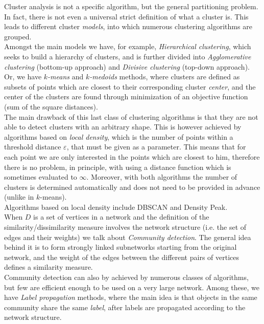 \documentclass[a4paper,11pt]{book}
\begin{document}
Cluster analysis is not a specific algorithm, but the general partitioning problem. In fact, there is not even a universal strict definition of what a cluster is. This leads to different cluster \textit{models}, into which numerous clustering algorithms are grouped.\\
Amongst the main models we have, for example, \textit{Hierarchical clustering}\cite{hie}, which seeks to build a hierarchy of clusters, and is further divided into \textit{Agglomerative clustering} (bottom-up approach) and \textit{Divisive clustering} (top-down approach).\\
Or, we have $k$\textit{-means} and $k$\textit{-medoids} methods, where clusters are defined as subsets of points which are closest to their corresponding cluster \textit{center}, and the center of the clusters are found through minimization of an objective function (sum of the square distances).\\
The main drawback of this last class of clustering algorithms is that they are not able to detect clusters with an arbitrary shape. This is however achieved by algorithms based on \textit{local density}, which is the number of points within a threshold distance $\varepsilon$, that must be given as a parameter. This means that for each point we are only interested in the points which
are closest to him, therefore there is no problem, in principle, with using a distance function which is sometimes evaluated to $\infty$. Moreover, with both algorithms the number of clusters is determined automatically and does not need to be provided in advance (unlike in $k$-means).\\
Algorithms based on local density include DBSCAN\cite{db} and Density Peak\cite{dp}.\\

When $D$ is a set of vertices in a network and the definition of the similarity/dissimilarity measure involves the network structure (i.e. the set of edges and their weights) we talk about \textit{Community detection}. The general idea behind it is to form strongly linked subnetworks starting from the original network, and the weight of the edges between the different pairs of vertices defines a similarity measure.\\
Community detection can also by achieved by numerous classes of algorithms\cite{commdet}, but few are efficient enough to be used on a very large network. Among these, we have \emph{Label propagation} methods, where the main idea is that objects in the same community share the same \textit{label}, after labels are propagated according to the network structure.
\end{document}
